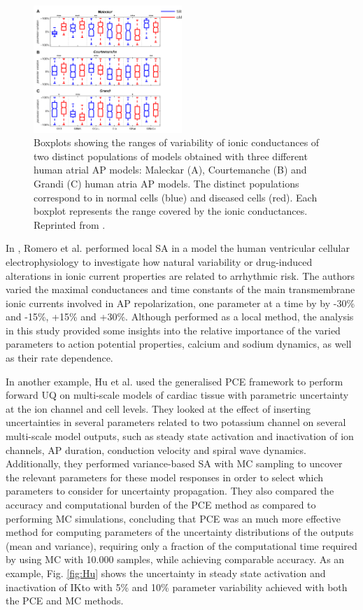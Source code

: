 \documentclass[12pt]{article}
\begin{document}
{\begin{figure}
	\centering
	\includegraphics[width=0.5\textwidth]{images/Sanchez.png}
	\caption{Boxplots showing the ranges of variability of ionic conductances of two distinct populations of models obtained with three different human atrial AP models: Maleckar (A), Courtemanche (B) and Grandi (C) human atria AP models. The distinct populations correspond to in normal cells (blue) and diseased cells (red). Each boxplot represents the range covered by the ionic conductances. Reprinted from \cite{Sanchez}. }
	\label{fig:Sanchez}
\end{figure}

\vspace{0.5cm}
In \cite{Romero2009}, Romero et al. performed local SA in a model the human ventricular cellular electrophysiology to investigate how natural variability or drug-induced alterations in ionic current properties are related to arrhythmic risk. The authors varied the maximal conductances and time constants of the main transmembrane ionic currents involved in AP repolarization, one parameter at a time by by -30\% and -15\%, +15\% and +30\%. Although performed as a local method, the analysis in this study provided some insights into the relative importance of the varied parameters to action potential properties, calcium and sodium dynamics, as well as their rate dependence.

In another example, Hu et al. \cite{HU201857} used the generalised PCE framework to perform forward UQ on multi-scale models of cardiac tissue with parametric uncertainty at the ion channel and cell levels. They looked at the effect of inserting uncertainties in several parameters related to two potassium channel on several multi-scale model outputs, such as steady state activation and inactivation of ion channels, AP duration, conduction velocity and spiral wave dynamics. Additionally, they performed variance-based SA with MC sampling to uncover the relevant parameters for these model responses in order to select which parameters to consider for uncertainty propagation. They also compared the accuracy and computational burden of the PCE method as compared to performing MC simulations, concluding that PCE was an much more effective method for computing parameters of the uncertainty distributions of the outputs (mean and variance), requiring only a fraction of the computational time required by using MC with 10.000 samples, while achieving comparable accuracy. As an example, Fig. \ref{fig:Hu} shows the uncertainty in steady state activation and inactivation of IKto with 5\% and 10\% parameter variability achieved with both the PCE and MC methods. 

}
\end{document}
